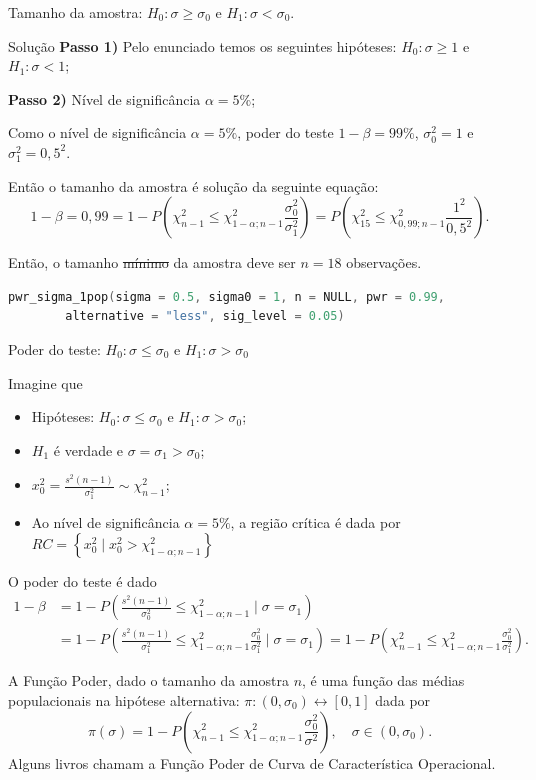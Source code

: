 \documentclass[8pt]{beamer}
\begin{document}
\begin{frame}[fragile]{Tamanho da amostra: $H_0: \sigma \geq \sigma_0$ e $H_1: \sigma < \sigma_0$.}

\begin{block}{Solução}
	\textbf{Passo 1)} Pelo enunciado temos os seguintes hipóteses: $H_0: \sigma \geq 1 $ e $H_1: \sigma < 1$;
	
	\textbf{Passo 2)} Nível de significância $\alpha=5\%$;
	
	Como o nível de significância $\alpha=5\%$, poder do teste $1-\beta=99\%$, $\sigma_0^2=1$ e $\sigma_1^2=0,5^2$.
	
	Então o tamanho da amostra é solução da seguinte equação:
	$$1-\beta=0,99=1-P\left( \chi_{n-1}^2 \leq \chi_{1-\alpha;n-1}^2 \frac{\sigma_0^2}{\sigma_1^2} \right) = P\left( \chi_{15}^2 \leq \chi_{0,99;n-1}^2 \frac{1^2}{0,5^2} \right).$$
	
	Então, o tamanho \sout{mínimo} da amostra deve ser $n=18$ observações.
\end{block}

\begin{lstlisting}[language = C, caption = Código no R.]
pwr_sigma_1pop(sigma = 0.5, sigma0 = 1, n = NULL, pwr = 0.99,
		alternative = "less", sig_level = 0.05)
\end{lstlisting}

\end{frame}

\begin{frame}{Poder do teste: $H_0: \sigma \leq \sigma_0$ e $H_1: \sigma > \sigma_0$}

Imagine que
\begin{itemize}
	\item Hipóteses: $H_0: \sigma \leq \sigma_0$ e $H_1: \sigma > \sigma_0$;
	\item $H_1$ é verdade e $\sigma = \sigma_1 > \sigma_0$;
	\item $x_0^2 = \frac{s^2(n-1)}{\sigma_1^2} \sim \chi_{n-1}^2$;
	\item Ao nível de significância $\alpha=5\%$, a região crítica é dada por $RC=\left\{ x_0^2 \mid x_0^2 > \chi_{1-\alpha; n-1}^2 \right\}$
\end{itemize}
\vfill

O poder do teste é dado
\begin{align*}
1- \beta &= 1 - P \left( \frac{s^2(n-1)}{\sigma_0^2} \leq \chi_{1-\alpha;n-1}^2 \mid \sigma = \sigma_1 \right)\\
&=1- P \left( \frac{s^2(n-1)}{\sigma_1^2} \leq \chi_{1-\alpha; n-1}^2 \frac{\sigma_0^2}{\sigma_1^2} \mid \sigma = \sigma_1 \right)= 1- P \left( \chi_{n-1}^2 \leq \chi_{1-\alpha; n-1}^2 \frac{\sigma_0^2}{\sigma_1^2} \right).
\end{align*}

A \textcolor{important}{Função Poder}, dado o tamanho da amostra $n$, é uma função das médias populacionais na hipótese alternativa: $\pi: (0,\sigma_0) \longleftrightarrow [0,1]$ dada por
$$\pi(\sigma) = 1 - P \left( \chi_{n-1}^2 \leq \chi_{1-\alpha; n-1}^2 \frac{\sigma_0^2}{\sigma^2} \right), \quad \sigma \in (0,\sigma_0).$$
Alguns livros chamam a Função Poder de  \textcolor{important}{Curva de Característica Operacional.}
\end{frame}
\end{document}
